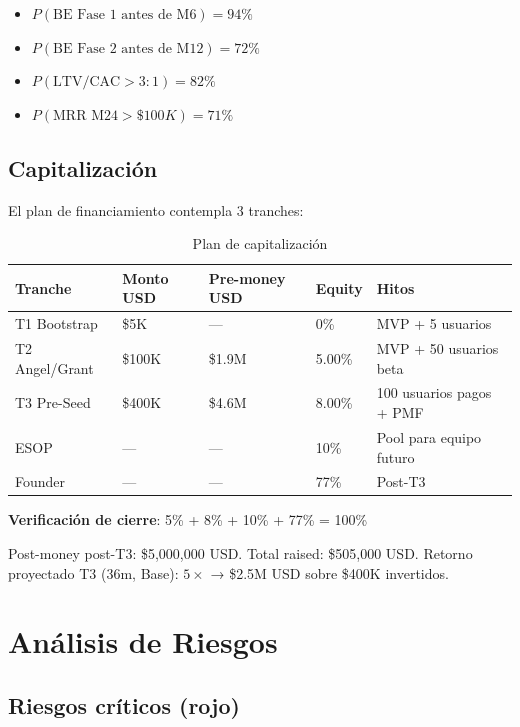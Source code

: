 \documentclass[10pt,a4paper,oneside]{report}
\begin{document}
\begin{itemize}[leftmargin=1.4em]
\item $P(\text{BE Fase 1 antes de M6}) = 94\%$
\item $P(\text{BE Fase 2 antes de M12}) = 72\%$
\item $P(\text{LTV/CAC} > 3:1) = 82\%$
\item $P(\text{MRR M24} > \$100K) = 71\%$
\end{itemize}

\section{Capitalización}
El plan de financiamiento contempla 3 tranches:

\begin{table}[H]
\centering
\begin{tabular}{p{2cm}p{2.5cm}p{2.5cm}p{2.5cm}p{2.5cm}}
\toprule
\textbf{Tranche} & \textbf{Monto USD} & \textbf{Pre-money USD} & \textbf{Equity} & \textbf{Hitos} \\
\midrule
T1 Bootstrap & \$5K & --- & 0\% & MVP + 5 usuarios \\
T2 Angel/Grant & \$100K & \$1.9M & 5.00\% & MVP + 50 usuarios beta \\
T3 Pre-Seed & \$400K & \$4.6M & 8.00\% & 100 usuarios pagos + PMF \\
\midrule
ESOP & --- & --- & 10\% & Pool para equipo futuro \\
Founder & --- & --- & 77\% & Post-T3 \\
\bottomrule
\end{tabular}
\caption{Plan de capitalización}
\end{table}

\textbf{Verificación de cierre}: 5\% + 8\% + 10\% + 77\% = 100\% \checkmark

Post-money post-T3: \$5,000,000 USD. Total raised: \$505,000 USD. Retorno proyectado T3 (36m, Base): $5\times$ → \$2.5M USD sobre \$400K invertidos.

\chapter{Análisis de Riesgos}

\section{Riesgos críticos (rojo)}
\end{document}
